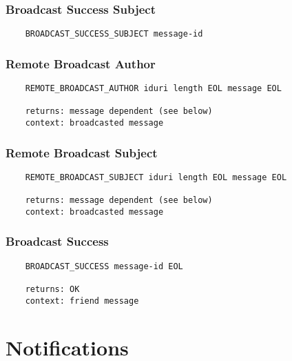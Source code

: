 \documentclass[letterpaper,11pt,oneside]{article}
\begin{document}
\subsubsection{Broadcast Success Subject}

\vspace{10pt}
\begin{verbatim}
    BROADCAST_SUCCESS_SUBJECT message-id
\end{verbatim}
\vspace{10pt}

\subsubsection{Remote Broadcast Author}

\vspace{10pt}
\begin{verbatim}
    REMOTE_BROADCAST_AUTHOR iduri length EOL message EOL

    returns: message dependent (see below)
    context: broadcasted message
\end{verbatim}
\vspace{10pt}

\subsubsection{Remote Broadcast Subject}

\vspace{10pt}
\begin{verbatim}
    REMOTE_BROADCAST_SUBJECT iduri length EOL message EOL

    returns: message dependent (see below)
    context: broadcasted message
\end{verbatim}
\vspace{10pt}

\subsubsection{Broadcast Success}

\vspace{10pt}
\begin{verbatim}
    BROADCAST_SUCCESS message-id EOL

    returns: OK
    context: friend message
\end{verbatim}
\vspace{10pt}

\section{Notifications}
\end{document}
